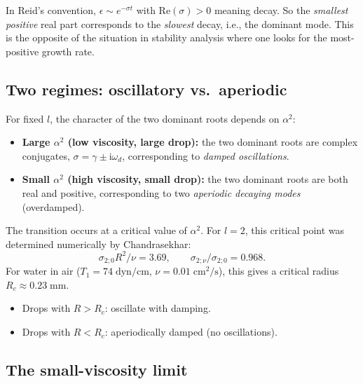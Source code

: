 \documentclass[12pt]{article}
\newcommand{\ii}{\mathrm{i}}
\theoremstyle{definition}
\begin{document}
\begin{notebox}
In Reid's convention, $\epsilon\sim e^{-\sigma t}$ with $\mathrm{Re}(\sigma)>0$
meaning decay. So the \emph{smallest positive} real part corresponds to the
\emph{slowest} decay, i.e., the dominant mode. This is the opposite of the
situation in stability analysis where one looks for the most-positive growth rate.
\end{notebox}

\subsection{Two regimes: oscillatory vs.\ aperiodic}

For fixed $l$, the character of the two dominant roots depends on $\alpha^2$:

\begin{itemize}
  \item \textbf{Large $\alpha^2$ (low viscosity, large drop):} the two dominant roots
        are complex conjugates, $\sigma = \gamma \pm \ii\omega_d$, corresponding to
        \emph{damped oscillations}.
  \item \textbf{Small $\alpha^2$ (high viscosity, small drop):} the two dominant roots
        are both real and positive, corresponding to two \emph{aperiodic decaying modes}
        (overdamped).
\end{itemize}

The transition occurs at a critical value of $\alpha^2$. For $l=2$, this critical point
was determined numerically by Chandrasekhar:
\begin{equation}
  \sigma_{2;0}R^2/\nu = 3.69, \qquad \sigma_{2;\nu}/\sigma_{2;0} = 0.968.
  \label{eq:critical}
\end{equation}
For water in air ($T_1 = 74\;\mathrm{dyn/cm}$, $\nu = 0.01\;\mathrm{cm^2/s}$), this
gives a critical radius $R_c \approx 0.23\;\mathrm{mm}$.

\begin{itemize}
  \item Drops with $R > R_c$: oscillate with damping.
  \item Drops with $R < R_c$: aperiodically damped (no oscillations).
\end{itemize}

\subsection{The small-viscosity limit}
\end{document}
